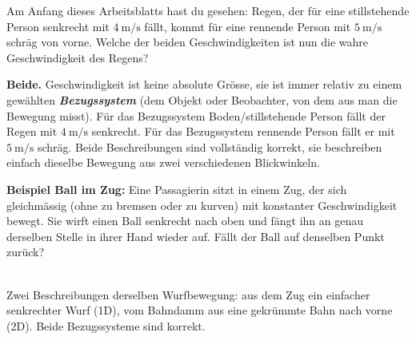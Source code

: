 \documentclass[addpoints,11pt,a4paper]{exam}
\begin{document}
\begin{theoriebox}
Am Anfang dieses Arbeitsblatts hast du gesehen: Regen, der für eine
stillstehende Person senkrecht mit $\SI{4}{\meter\per\second}$ fällt,
kommt für eine rennende Person mit $\SI{5}{\meter\per\second}$ schräg von
vorne. Welche der beiden Geschwindigkeiten ist nun die \glqq
wahre\grqq{} Geschwindigkeit des Regens?

\textbf{Beide.} Geschwindigkeit ist keine absolute Grösse, sie ist immer
relativ zu einem gewählten \textbf{\emph{Bezugssystem}} (dem Objekt oder
Beobachter, von dem aus man die Bewegung misst). Für das Bezugssystem
\glqq Boden/stillstehende Person\grqq{} fällt der Regen mit
$\SI{4}{\meter\per\second}$ senkrecht. Für das Bezugssystem \glqq rennende
Person\grqq{} fällt er mit $\SI{5}{\meter\per\second}$ schräg. Beide
Beschreibungen sind vollständig korrekt, sie beschreiben einfach dieselbe
Bewegung aus zwei verschiedenen Blickwinkeln.

\textbf{Beispiel Ball im Zug:} Eine Passagierin sitzt in einem Zug, der sich
gleichmässig (ohne zu bremsen oder zu kurven) mit konstanter Geschwindigkeit
bewegt. Sie wirft einen Ball senkrecht nach oben und fängt ihn an genau
derselben Stelle in ihrer Hand wieder auf. Fällt der Ball auf denselben
Punkt zurück?

\begin{center}
\\[-0.1em]
{\scriptsize Zwei Beschreibungen derselben Wurfbewegung: aus dem Zug ein
einfacher senkrechter Wurf (1D), vom Bahndamm aus eine gekrümmte Bahn nach
vorne (2D). Beide Bezugssysteme sind korrekt.}
\end{center}


\end{theoriebox}
\end{document}
